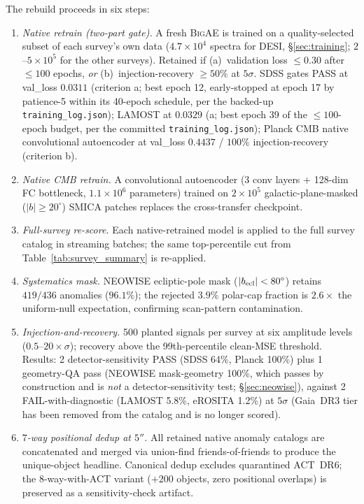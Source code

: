 \documentclass[aps,prd,twocolumn,superscriptaddress,showpacs,preprintnumbers,nofootinbib,longbibliography,floatfix]{revtex4-2}
\newcommand{\BigAE}{\textsc{BigAE}}
\begin{document}
The rebuild proceeds in six steps:
\begin{enumerate}[leftmargin=*]
  \item \textit{Native retrain (two-part gate).} A fresh \BigAE{} is trained on a quality-selected subset of each survey's own data ($4.7\!\times\!10^4$ spectra for DESI, \S\ref{sec:training}; $2$--$5\!\times\!10^5$ for the other surveys). Retained if (a)~validation loss $\leq 0.30$ after $\leq\!100$ epochs, \emph{or} (b)~injection-recovery $\geq\!50\%$ at $5\sigma$. SDSS gates PASS at val\_loss $0.0311$ (criterion a; best epoch 12, early-stopped at epoch 17 by patience-5 within its 40-epoch schedule, per the backed-up \texttt{training\_log.json}); LAMOST at $0.0329$ (a; best epoch 39 of the $\leq\!100$-epoch budget, per the committed \texttt{training\_log.json}); Planck CMB native convolutional autoencoder at val\_loss $0.4437$ / $100\%$ injection-recovery (criterion b).
  \item \textit{Native CMB retrain.} A convolutional autoencoder (3 conv layers $+$ 128-dim FC bottleneck, $1.1\!\times\!10^6$ parameters) trained on $2\!\times\!10^5$ galactic-plane-masked ($|b|\geq 20^\circ$) SMICA patches replaces the cross-transfer checkpoint.
  \item \textit{Full-survey re-score.} Each native-retrained model is applied to the full survey catalog in streaming batches; the same top-percentile cut from Table~\ref{tab:survey_summary} is re-applied.
  \item \textit{Systematics mask.} NEOWISE ecliptic-pole mask ($|b_{\rm ecl}|<80^\circ$) retains $419/436$ anomalies ($96.1\%$); the rejected $3.9\%$ polar-cap fraction is $2.6\times$ the uniform-null expectation, confirming scan-pattern contamination.
  \item \textit{Injection-and-recovery.} 500 planted signals per survey at six amplitude levels ($0.5$--$20\times\sigma$); recovery above the 99th-percentile clean-MSE threshold. Results: 2 detector-sensitivity PASS (SDSS 64\%, Planck 100\%) plus 1 geometry-QA pass (NEOWISE mask-geometry 100\%, which passes by construction and is \emph{not} a detector-sensitivity test; \S\ref{sec:neowise}), against 2 FAIL-with-diagnostic (LAMOST 5.8\%, eROSITA 1.2\%) at $5\sigma$ (Gaia~DR3 tier has been removed from the catalog and is no longer scored).
  \item \textit{$7$-way positional dedup at $5''$.} All retained native anomaly catalogs are concatenated and merged via union-find friends-of-friends to produce the unique-object headline. Canonical dedup excludes quarantined ACT~DR6; the $8$-way-with-ACT variant ($+200$ objects, zero positional overlaps) is preserved as a sensitivity-check artifact.
\end{enumerate}
\end{document}
